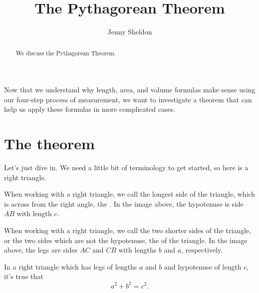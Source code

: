\documentclass{ximera}
\title{The Pythagorean Theorem}
\author{Jenny Sheldon}
\begin{document}
\begin{abstract}
We discuss the Pythagorean Theorem.
\end{abstract}
\maketitle

Now that we understand why length, area, and volume formulas make sense using our four-step process of measurement, we want to investigate a theorem that can help us apply these formulas in more complicated cases.

\section{The theorem}
Let's just dive in. We need a little bit of terminology to get started, so here is a right triangle.
\begin{image}
\end{image}
\begin{definition}
When working with a right triangle, we call the longest side of the triangle, which is across from the right angle, the . In the image above, the hypotenuse is side $AB$ with length $c$.

When working with a right triangle, we call the two shorter sides of the triangle, or the two sides which are not the hypotenuse, the  of the triangle. In the image above, the legs are sides $AC$ and $CB$ with lengths $b$ and $a$, respectively.
\end{definition}

\begin{theorem}
 In a right triangle which has legs of lengths $a$ and $b$ and hypotenuse of length $c$, it's true that
\[
a^2 + b^2 = c^2.
\]
\end{theorem}
\end{document}
